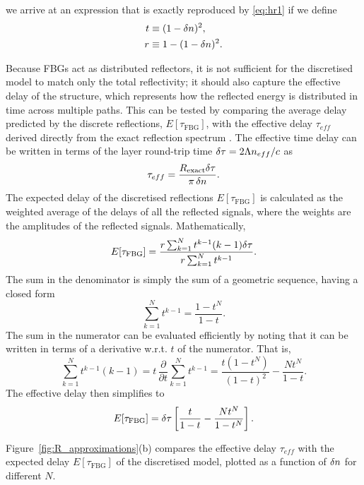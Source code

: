 %
we arrive at an expression that is exactly reproduced by \eqref{eq:hr1} if we define
%
\begin{align}
\label{eq:tr}
t &\equiv (1-\delta n)^2, \\
r &\equiv 1-(1-\delta n)^2.
\end{align}
%
\par
%
Because FBGs act as distributed reflectors, it is not sufficient for the discretised model to match only the total reflectivity; it should also capture the effective delay of the structure, which represents how the reflected energy is distributed in time across multiple paths.
This can be tested by comparing the average delay predicted by the discrete reflections, $E[\tau_\text{FBG}]$, with the effective delay $\tau_{eff}$ derived directly from the exact reflection spectrum \cite{barmenkov2006effective}.
The effective time delay can be written in terms of the layer round-trip time $\delta \tau = 2 \Lambda n_{eff}/c$ as
%
\begin{equation}
    \label{eq:tau_exact}
    \tau_{eff} = \frac{R_\text{exact} \delta \tau}{\pi \, \delta n}.
\end{equation}
%
The expected delay of the discretised reflections $E[\tau_\text{FBG}]$ is calculated as the weighted average of the delays of all the reflected signals, where the weights are the amplitudes of the reflected signals.
Mathematically,
%
\begin{equation*}
    E[\tau_\text{FBG}] = \frac{r \sum_{k=1}^{N} t^{k-1} (k-1)\delta \tau}{r \sum_{k=1}^{N} t^{k-1}}.
\end{equation*}
%
The sum in the denominator is simply the sum of a geometric sequence, having a closed form
%
\begin{equation*}
    \sum_{k=1}^{N} t^{k-1} = \frac{1-t^N}{1-t}.
\end{equation*}
%
The sum in the numerator can be evaluated efficiently by noting that it can be written in terms of a derivative w.r.t. $t$ of the numerator.
That is,
%
\begin{equation*}
    \sum_{k=1}^{N} t^{k-1} (k-1) = t \, \frac{\partial}{\partial t} \sum_{k=1}^{N} t^{k-1} = \frac{t(1-t^N)}{(1-t)^2} - \frac{N t^N}{1-t}.
\end{equation*}
%
The effective delay then simplifies to
%
\begin{equation}
    \label{eq:tau_approx}
    E[\tau_\text{FBG}] = \delta \tau\left[ \frac{t}{1-t} - \frac{N t^N}{1-t^N} \right].
\end{equation}
%
\par
%
Figure~\ref{fig:R_approximations}(b) compares the effective delay $\tau_{eff}$ with the expected delay $E[\tau_\text{FBG}]$ of the discretised model, plotted as a function of $\delta n$ for different $N$.
